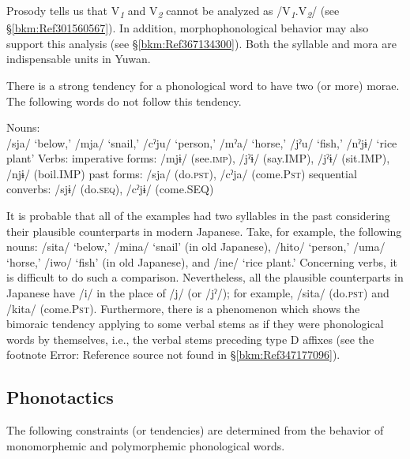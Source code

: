 Prosody tells us that V\textit{\textsubscript{1}} and V\textit{\textsubscript{2}} cannot be analyzed as /V\textit{\textsubscript{1}}.V\textit{\textsubscript{2}}/ (see §\ref{bkm:Ref301560567}). In addition, morphophonological behavior may also support this analysis (see §\ref{bkm:Ref367134300}). Both the syllable and mora are indispensable units in Yuwan.

There is a strong tendency for a phonological word to have two (or more) morae. The following words do not follow this tendency.

\ea 
\ea Nouns:\\
    /sja/ ‘below,’ /mja/\footnotemark{} ‘snail,’ /cˀju/ ‘person,’ /mˀa/ ‘horse,’ /jˀu/ ‘fish,’ /nˀjɨ/ ‘rice plant’
\ex Verbs:
\ea imperative forms: /mjɨ/ (see.\textsc{imp}), /jˀɨ/ (say.IMP), /jˀɨ/ (sit.IMP), /njɨ/ (boil.IMP)
\ex past forms: /sja/ (do.\textsc{pst}), /cˀja/ (come.P\textsc{st})
\ex sequential converbs:  /sjɨ/ (do.\textsc{seq}), /cˀjɨ/ (come.SEQ)
\z
\z
\z
{}

It is probable that all of the examples had two syllables in the past considering their plausible counterparts in modern Japanese. Take, for example, the following nouns: /sita/ ‘below,’ /mina/ ‘snail’ (in old Japanese), /hito/ ‘person,’ /uma/ ‘horse,’ /iwo/ ‘fish’ (in old Japanese), and /ine/ ‘rice plant.’ Concerning verbs, it is difficult to do such a comparison. Nevertheless, all the plausible counterparts in Japanese have /i/ in the place of /j/ (or /jˀ/); for example, /sita/ (do.\textsc{pst}) and /kita/ (come.P\textsc{st}). Furthermore, there is a phenomenon which shows the bimoraic tendency applying to some verbal stems as if they were phonological words by themselves, i.e., the verbal stems preceding type D affixes (see the footnote Error: Reference source not found in §\ref{bkm:Ref347177096}).

\subsection{Phonotactics}
\label{bkm:Ref302599510}\hypertarget{RefHeadingToc395696971}{}
The following constraints (or tendencies) are determined from the behavior of monomorphemic and polymorphemic phonological words.

